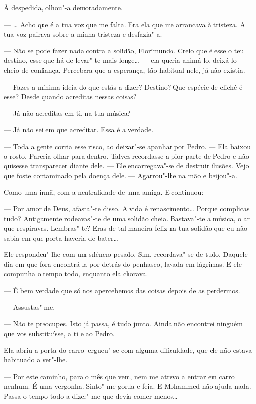 À despedida, olhou"-a demoradamente.

--- \ldots{} Acho que é a tua voz que me falta. Era ela que me arrancava à
tristeza. A tua voz pairava sobre a minha tristeza e desfazia"-a.

--- Não se pode fazer nada contra a solidão, Florimundo. Creio que é esse
o teu destino, esse que há-de levar"-te mais longe\ldots{} --- ela queria
animá-lo, deixá-lo cheio de confiança. Percebera que a esperança, tão
habitual nele, já não existia.

--- Fazes a mínima ideia do que estás a dizer? Destino? Que espécie de
cliché é esse? Desde quando acreditas nessas coisas?

--- Já não acreditas em ti, na tua música?

--- Já não sei em que acreditar. Essa é a verdade.

--- Toda a gente corria esse risco, ao deixar"-se apanhar por Pedro. --- Ela
baixou o rosto. Parecia olhar para dentro. Talvez recordasse a pior
parte de Pedro e não quisesse transparecer diante dele. --- Ele
encarregava"-se de destruir ilusões. Vejo que foste contaminado pela
doença dele. --- Agarrou"-lhe na mão e beijou"-a.

Como uma irmã, com a neutralidade de uma amiga. E continuou:

--- Por amor de Deus, afasta"-te disso. A vida é renascimento\ldots{} Porque
complicas tudo? Antigamente rodeavas"-te de uma solidão cheia. Bastava"-te
a música, o ar que respiravas. Lembras"-te? Eras de tal maneira feliz na
tua solidão que eu não sabia em que porta haveria de bater\ldots{}

Ele respondeu"-lhe com um silêncio pesado. Sim, recordava"-se de tudo.
Daquele dia em que fora encontrá-la por detrás do penhasco, lavada em
lágrimas. E ele compunha o tempo todo, enquanto ela chorava.

--- É bem verdade que só nos apercebemos das coisas depois de as
perdermos.

--- Assustas"-me.

--- Não te preocupes. Isto já passa, é tudo junto. Ainda não encontrei
ninguém que vos substituísse, a ti e ao Pedro.

Ela abriu a porta do carro, ergueu"-se com alguma dificuldade, que ele
não estava habituado a ver"-lhe.

--- Por este caminho, para o mês que vem, nem me atrevo a entrar em carro
nenhum. É uma vergonha. Sinto"-me gorda e feia. E Mohammed não ajuda
nada. Passa o tempo todo a dizer"-me que devia comer menos\ldots{}

